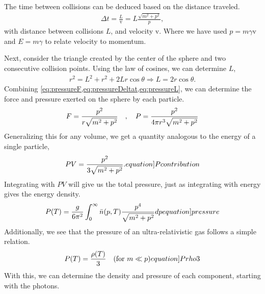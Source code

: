 The time between collisions can be deduced based on the distance traveled.
\begin{align}
    \Delta t = \frac{L}{\mathrm{v}}=L\frac{\sqrt{m^2+p^2}}{p},
    \label{eq:pressureDeltat}
\end{align}
with distance between collisions $L$, and velocity $\mathrm{v}$. Where we have used $p=m\gamma \mathrm{v}$ and $E=m\gamma$ to relate velocity to momentum.

Next, consider the triangle created by the center of the sphere and two consecutive collision points. Using the law of cosines, we can determine $L$,
\begin{align}
    r^2=L^2+r^2+2L r \cos \theta \Rightarrow
    L = 2r \cos \theta.
    \label{eq:pressureL}
\end{align}
Combining \cref{eq:pressureF,eq:pressureDeltat,eq:pressureL}, we can determine the force and pressure exerted on the sphere by each particle. 
\begin{align}
    F = \frac{p^2}{r\sqrt{m^2+p^2}} \quad , \quad P = \frac{p^2}{4\pi r^3\sqrt{m^2+p^2}}
\end{align}
Generalizing this for any volume, we get a quantity analogous to the energy of a single particle,
\begin{align}
    PV=\frac{p^2}{3\sqrt{m^2+p^2}} .
    \label[equation]{Pcontribution}
\end{align}
Integrating with $PV$ will give us the total pressure, just as integrating with energy gives the energy density.
\begin{align}
    P(T)=\frac{g}{6\pi^2}\int_{0}^{\infty}\bar{n}(p,T)\frac{p^4}{\sqrt{m^2+p^2}}dp
    \label[equation]{pressure}
\end{align}
Additionally, we see that the pressure of an ultra-relativistic gas follows a simple relation.
\begin{align}
    P(T)=\frac{\rho(T)}{3} \quad (\text{for } m\ll p)
    \label[equation]{Prho3}
\end{align}
With this, we can determine the density and pressure of each component, starting with the photons.

